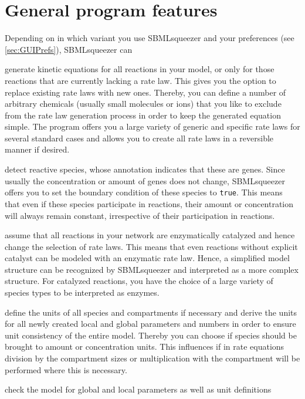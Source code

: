 \section{General program features}

Depending on in which variant you use SBMLsqueezer and your preferences (see \vref{sec:GUIPrefs}),
SBMLsqueezer can
\begin{dinglist}{52}
\item generate kinetic equations for all reactions in your model, or only for those
  reactions that are currently lacking a rate law.
  This gives you the option to replace existing rate laws with new ones.
  Thereby, you can define a number of arbitrary chemicals (usually small molecules or
  ions) that you like to exclude from the rate law generation process in order to keep
  the generated equation simple.
  The program offers you a large variety of generic and specific rate laws for several
  standard cases and allows you to create all rate laws in a reversible manner if desired.
\item detect reactive species, whose annotation indicates that these are genes.
  Since usually the concentration or amount of genes does not change, SBMLsqueezer
  offers you to set the boundary condition of these species to \texttt{true}.
  This means that even if these species participate in reactions, their amount or
  concentration will always remain constant, irrespective of their participation in reactions.
\item assume that all reactions in your network are enzymatically catalyzed and hence
  change the selection of rate laws. This means that even reactions without explicit
  catalyst can be modeled with an enzymatic rate law. Hence, a simplified model structure
  can be recognized by SBMLsqueezer and interpreted as a more complex structure.
  For catalyzed reactions, you have the choice of a large variety of species types to
  be interpreted as enzymes.
\item define the units of all species and compartments if necessary and derive the
  units for all newly created local and global parameters and numbers in order to ensure unit
  consistency of the entire model. Thereby you can choose if species should be brought
  to amount or concentration units. This influences if in rate equations division by
  the compartment sizes or multiplication with the compartment will be performed where
  this is necessary.
\item check the model for global and local parameters as well as unit definitions

\end{dinglist}
